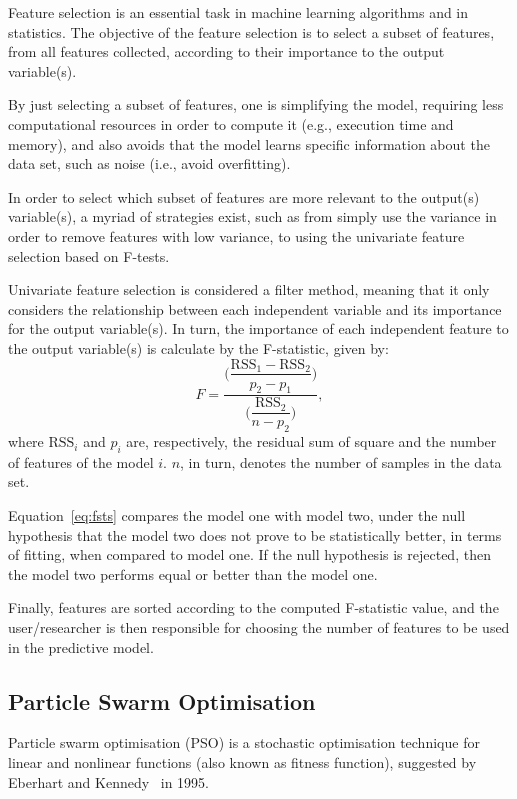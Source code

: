 Feature selection is an essential task in machine learning algorithms and in statistics. The objective of the feature selection is to select a subset of features, from all features collected, according to their importance to the output variable(s). 

By just selecting a subset of features, one is simplifying the model, requiring less computational resources in order to compute it (e.g., execution time and memory), and also avoids that the model learns specific information about the data set, such as noise (i.e., avoid overfitting).

In order to select which subset of features are more relevant to the output(s) variable(s), a myriad of strategies exist, such as from simply use the variance in order to remove features with low variance, to using the univariate feature selection based on F-tests. 

Univariate feature selection is considered a filter method, meaning that it only considers the relationship between each independent variable and its importance for the output variable(s). In turn, the importance of each independent feature to the output variable(s) is calculate by the F-statistic, given by:
\begin{equation}\label{eq:fsts}
    F = \dfrac{\Big (\dfrac{\text{RSS}_1-\text{RSS}_2}{p_2-p_1}\Big )}{\Big ( \dfrac{\text{RSS}_2}{n-p_2} \Big )},
\end{equation}
where $\text{RSS}_i$ and $p_i$ are, respectively,  the residual sum of square and the number of features of the model $i$. $n$, in turn, denotes the number of samples in the data set. 

Equation~\eqref{eq:fsts} compares the model one with model two, under the null hypothesis that the model two does not prove to be statistically better, in terms of fitting, when compared to model one. If the null hypothesis is rejected, then the model two performs equal or better than the model one. 

Finally, features are sorted according to the computed F-statistic value, and the user/researcher is then responsible for choosing the number of features to be used in the predictive model.

\subsection{Particle Swarm Optimisation}

Particle swarm optimisation (PSO) is a stochastic optimisation technique for linear and nonlinear functions (also known as fitness function), suggested by Eberhart and Kennedy~\cite{kennedy,eberhart} in 1995.

